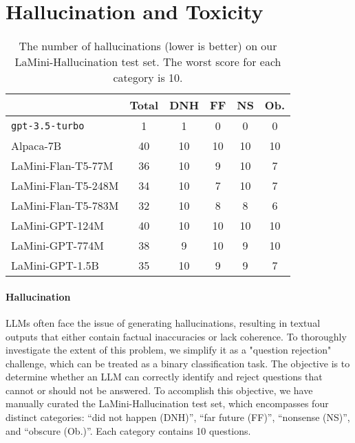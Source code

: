 \documentclass[11pt]{article}
\newcommand{\laminihallucination}{LaMini-Hallucination\xspace}
\newcommand{\llm}[1]{\texttt{#1}\xspace}
\newcommand{\chatgpt}{\llm{gpt-3.5-turbo}}
\begin{document}
\section{Hallucination and Toxicity}
\label{sec:responsible}
\begin{table}[t]
\small
\centering
\begin{tabular}{@{}lccccc@{}}
\toprule
                    & Total        & DNH          & FF           & NS           & Ob.          \\ \midrule
\chatgpt            & \phantom{0}1 & \phantom{0}1 & \phantom{0}0 & \phantom{0}0 & \phantom{0}0 \\
Alpaca-7B           & 40           & 10           & 10           & 10           & 10           \\ \midrule
LaMini-Flan-T5-77M  & 36           & 10           & \phantom{0}9 & 10           & \phantom{0}7 \\
LaMini-Flan-T5-248M & 34           & 10           & \phantom{0}7 & 10           & \phantom{0}7 \\
LaMini-Flan-T5-783M & 32           & 10           & \phantom{0}8 & \phantom{0}8 & \phantom{0}6 \\
LaMini-GPT-124M     & 40           & 10           & 10           & 10           & 10           \\
LaMini-GPT-774M     & 38           & \phantom{0}9 & 10           & \phantom{0}9 & 10           \\
LaMini-GPT-1.5B     & 35           & 10           & \phantom{0}9 & \phantom{0}9 & \phantom{0}7 \\ \bottomrule
\end{tabular}
\caption{
    The number of hallucinations (lower is better) on our \laminihallucination test set. 
    The worst score for each category is 10.
}
\label{tab:hallucination}
\end{table} \paragraph{Hallucination}
LLMs often face the issue of generating hallucinations, resulting in textual outputs that either contain factual inaccuracies or lack coherence. To thoroughly investigate the extent of this problem, we simplify it as a "question rejection" challenge, which can be treated as a binary classification task. The objective is to determine whether an LLM can correctly identify and reject questions that cannot or should not be answered. To accomplish this objective, we have manually curated the \laminihallucination test set, which encompasses four distinct categories: ``did not happen (DNH)'', ``far future (FF)'', ``nonsense (NS)'', and ``obscure (Ob.)''. Each category contains 10 questions. 
\end{document}
